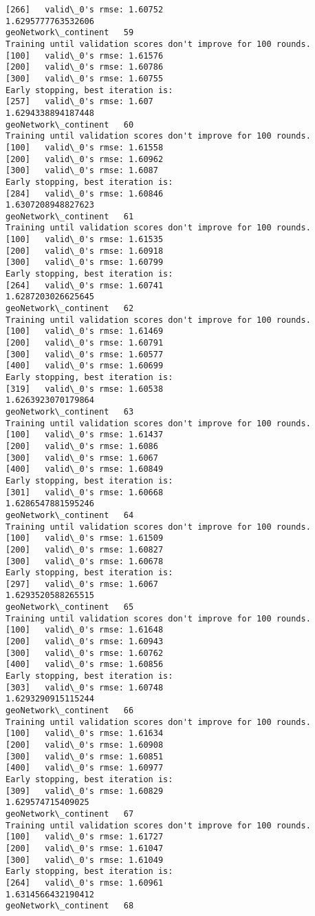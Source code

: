 \documentclass[11pt]{article}
\begin{document}
\begin{Verbatim}[commandchars=\\\{\}]
[266]	valid\_0's rmse: 1.60752
1.6295777763532606
geoNetwork\_continent   59
Training until validation scores don't improve for 100 rounds.
[100]	valid\_0's rmse: 1.61576
[200]	valid\_0's rmse: 1.60786
[300]	valid\_0's rmse: 1.60755
Early stopping, best iteration is:
[257]	valid\_0's rmse: 1.607
1.6294338894187448
geoNetwork\_continent   60
Training until validation scores don't improve for 100 rounds.
[100]	valid\_0's rmse: 1.61558
[200]	valid\_0's rmse: 1.60962
[300]	valid\_0's rmse: 1.6087
Early stopping, best iteration is:
[284]	valid\_0's rmse: 1.60846
1.6307208948827623
geoNetwork\_continent   61
Training until validation scores don't improve for 100 rounds.
[100]	valid\_0's rmse: 1.61535
[200]	valid\_0's rmse: 1.60918
[300]	valid\_0's rmse: 1.60799
Early stopping, best iteration is:
[264]	valid\_0's rmse: 1.60741
1.6287203026625645
geoNetwork\_continent   62
Training until validation scores don't improve for 100 rounds.
[100]	valid\_0's rmse: 1.61469
[200]	valid\_0's rmse: 1.60791
[300]	valid\_0's rmse: 1.60577
[400]	valid\_0's rmse: 1.60699
Early stopping, best iteration is:
[319]	valid\_0's rmse: 1.60538
1.6263923070179864
geoNetwork\_continent   63
Training until validation scores don't improve for 100 rounds.
[100]	valid\_0's rmse: 1.61437
[200]	valid\_0's rmse: 1.6086
[300]	valid\_0's rmse: 1.6067
[400]	valid\_0's rmse: 1.60849
Early stopping, best iteration is:
[301]	valid\_0's rmse: 1.60668
1.6286547881595246
geoNetwork\_continent   64
Training until validation scores don't improve for 100 rounds.
[100]	valid\_0's rmse: 1.61509
[200]	valid\_0's rmse: 1.60827
[300]	valid\_0's rmse: 1.60678
Early stopping, best iteration is:
[297]	valid\_0's rmse: 1.6067
1.6293520588265515
geoNetwork\_continent   65
Training until validation scores don't improve for 100 rounds.
[100]	valid\_0's rmse: 1.61648
[200]	valid\_0's rmse: 1.60943
[300]	valid\_0's rmse: 1.60762
[400]	valid\_0's rmse: 1.60856
Early stopping, best iteration is:
[303]	valid\_0's rmse: 1.60748
1.6293290915115244
geoNetwork\_continent   66
Training until validation scores don't improve for 100 rounds.
[100]	valid\_0's rmse: 1.61634
[200]	valid\_0's rmse: 1.60908
[300]	valid\_0's rmse: 1.60851
[400]	valid\_0's rmse: 1.60977
Early stopping, best iteration is:
[309]	valid\_0's rmse: 1.60829
1.629574715409025
geoNetwork\_continent   67
Training until validation scores don't improve for 100 rounds.
[100]	valid\_0's rmse: 1.61727
[200]	valid\_0's rmse: 1.61047
[300]	valid\_0's rmse: 1.61049
Early stopping, best iteration is:
[264]	valid\_0's rmse: 1.60961
1.6314566432190412
geoNetwork\_continent   68

\end{Verbatim}
\end{document}
